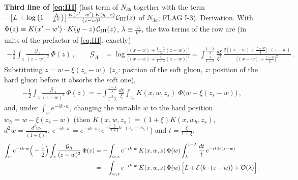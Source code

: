 \documentclass[9pt]{article}
\numberwithin{equation}{section}
\begin{document}
\noindent\textbf{Third line of \eqref{eq:III}} (last term of $N_{3b}$ together with the term $-\big[L+\log\big(1-\frac{\Lambda}{k^{+}}\big)\big]\frac{K(x'-w')\cdot K(y-z)}{(z-w)^{2}}\mathcal{C}_{\rm III}(z)$ of $N_{3a}$; FLAG I-3). Derivation. With $\Phi(z)\equiv K(x'-w')\cdot K(y-z)\,\mathcal{C}_{\rm III}(z)$, $\lambda\equiv\frac{\Lambda}{k^{+}}$, the two terms of the row are (in units of the prefactor of \eqref{eq:III}, exactly)
\begin{align}
-\frac12\int_{z}\frac{\mathcal{G}_{\Lambda}}{(z-w)^{2}}\,\Phi(z)\,,\qquad
\mathcal{G}_{\Lambda}&=\log\frac{\big[(x-w)+\frac{1-\lambda}{\lambda}(z-w)\big]^{2}}{\big[(x-w)+\frac{\lambda}{1-\lambda}(z-w)\big]^{2}}
=\int_{\frac{\lambda}{1-\lambda}}^{\frac{1-\lambda}{\lambda}}\frac{d\xi}{\xi^{2}}\,\frac{2\,\big[(x-w)+\frac{z-w}{\xi}\big]\cdot(z-w)}{\big[(x-w)+\frac{z-w}{\xi}\big]^{2}}\,.\label{eq:IIIA1}
\end{align}
Substituting $z=w-\xi(z_{s}-w)$ ($z_{s}$: position of the soft gluon, $z$: position of the hard gluon before it absorbs the soft one),
\begin{align}
-\frac12\int_{z}\frac{\mathcal{G}_{\Lambda}}{(z-w)^{2}}\,\Phi(z)=-\int_{\frac{\lambda}{1-\lambda}}^{\frac{1-\lambda}{\lambda}}\frac{d\xi}{\xi}\int_{z_{s}}K(x,w,z_{s})\;\Phi\big(w-\xi(z_{s}-w)\big)\,,\label{eq:IIIA2}
\end{align}
and, under $\int_{w}e^{-ik\cdot w}$, changing the variable $w$ to the hard position $w_{h}=w-\xi(z_{s}-w)$ (then $K(x,w,z_{s})=(1+\xi)K(x,w_{h},z_{s})$, $d^{2}w=\frac{d^{2}w_{h}}{(1+\xi)^{2}}$, $e^{-ik\cdot w}=e^{-ik\cdot w_{h}}e^{-i\frac{\xi}{1+\xi}k\cdot(z_{s}-w_{h})}$) and $t=\frac{\xi}{1+\xi}$,
\begin{align}
\int_{w}e^{-ik\cdot w}\Big(-\frac12\Big)\int_{z}\frac{\mathcal{G}_{\Lambda}}{(z-w)^{2}}\,\Phi(z)
&=-\int_{w,z}e^{-ik\cdot w}\,K(x,w,z)\,\Phi(w)\int_{\lambda}^{1-\lambda}\frac{dt}{t}\,e^{-it\,k\cdot(z-w)}\notag\\
&=-\int_{w,z}e^{-ik\cdot w}\,K(x,w,z)\,\Phi(w)\,\Big[L+\mathcal{E}\big(k\cdot(z-w)\big)+{\cal O}(\lambda)\Big]\,.\label{eq:IIIA3}
\end{align}
\end{document}
